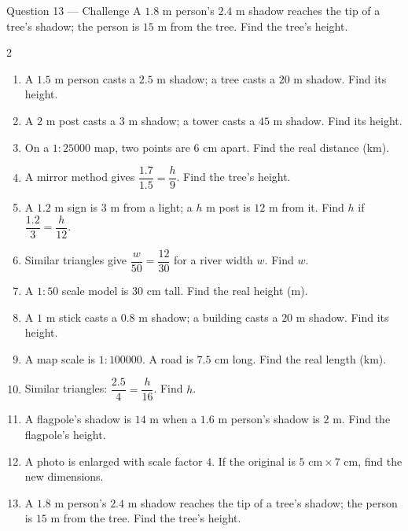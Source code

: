 \documentclass[11pt]{article}
\begin{document}
\begin{qbox}{Question 13 --- Challenge}
A $1.8$ m person's $2.4$ m shadow reaches the tip of a tree's shadow; the person is $15$ m from the tree. Find the tree's height.\workspace{3.0cm}
\end{qbox}

\clearpage
{}

\begin{recapbox}
\begin{multicols}{2}
\small
\begin{enumerate}[leftmargin=*,itemsep=3pt]
  \item A $1.5$ m person casts a $2.5$ m shadow; a tree casts a $20$ m shadow. Find its height.
  \item A $2$ m post casts a $3$ m shadow; a tower casts a $45$ m shadow. Find its height.
  \item On a $1:25000$ map, two points are $6$ cm apart. Find the real distance (km).
  \item A mirror method gives $\dfrac{1.7}{1.5}=\dfrac{h}{9}$. Find the tree's height.
  \item A $1.2$ m sign is $3$ m from a light; a $h$ m post is $12$ m from it. Find $h$ if $\dfrac{1.2}{3}=\dfrac{h}{12}$.
  \item Similar triangles give $\dfrac{w}{50}=\dfrac{12}{30}$ for a river width $w$. Find $w$.
  \item A $1:50$ scale model is $30$ cm tall. Find the real height (m).
  \item A $1$ m stick casts a $0.8$ m shadow; a building casts a $20$ m shadow. Find its height.
  \item A map scale is $1:100000$. A road is $7.5$ cm long. Find the real length (km).
  \item Similar triangles: $\dfrac{2.5}{4}=\dfrac{h}{16}$. Find $h$.
  \item A flagpole's shadow is $14$ m when a $1.6$ m person's shadow is $2$ m. Find the flagpole's height.
  \item A photo is enlarged with scale factor $4$. If the original is $5\text{ cm}\times7\text{ cm}$, find the new dimensions.
  \item A $1.8$ m person's $2.4$ m shadow reaches the tip of a tree's shadow; the person is $15$ m from the tree. Find the tree's height.
\end{enumerate}
\end{multicols}
\end{recapbox}
\end{document}
